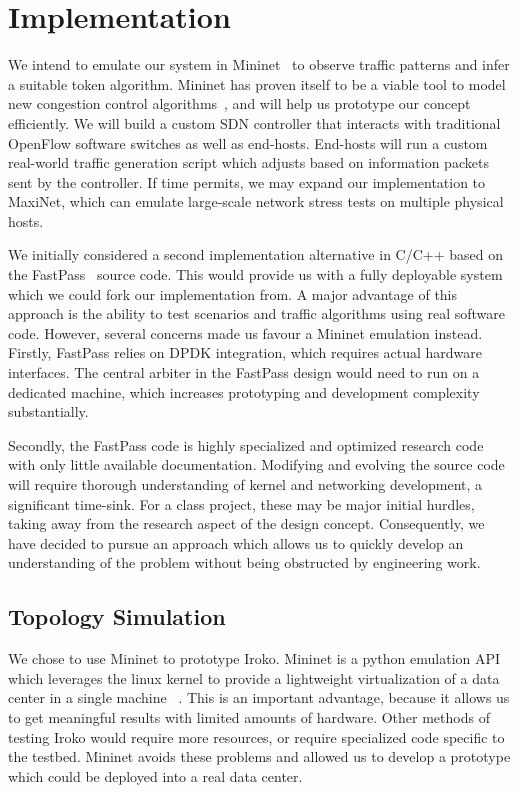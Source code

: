 

\section{Implementation}
\label{sec:implementation}
We intend to emulate our system in Mininet~\cite{mininet} to observe traffic 
patterns and infer a suitable token algorithm. Mininet has proven itself to be 
a viable tool to model new congestion control 
algorithms~\cite{mininet_learning}, and will help us prototype our concept 
efficiently. We will build a custom SDN controller that interacts with 
traditional OpenFlow software switches as well as end-hosts. End-hosts will run 
a custom real-world traffic generation script which adjusts based on 
information packets sent by the controller.
If time permits, we may expand our implementation to MaxiNet, which can emulate 
large-scale network stress tests on multiple physical hosts.

We initially considered a second implementation alternative in C/C++ based on 
the FastPass~\cite{fastpass} source code. This would provide us with a fully 
deployable system which we could fork our implementation from. A major 
advantage of this approach is the ability to test scenarios and traffic 
algorithms using real software code.
However, several concerns made us favour a Mininet emulation instead.
Firstly, FastPass relies on DPDK integration, which requires actual hardware 
interfaces. The central arbiter in the FastPass design would need to run on a 
dedicated machine, which increases prototyping and development complexity 
substantially.

Secondly, the FastPass code is highly specialized and optimized research code 
with only little available documentation. Modifying and evolving the source 
code will require thorough understanding of kernel and networking development, 
a significant time-sink. For a class project, these may be major initial 
hurdles, taking away from the research aspect of the design concept.
Consequently, we have decided to pursue an approach which allows us to quickly 
develop an understanding of the problem without being obstructed by engineering 
work.

\subsection{Topology Simulation}
We chose to use  Mininet to prototype Iroko. Mininet is a python emulation API which leverages the linux kernel to provide a lightweight virtualization of a data center in a single machine ~\cite{mininet}. This is an important advantage, because it allows us to get meaningful results with limited amounts of hardware. Other methods of testing Iroko would require more resources, or require specialized code specific to the testbed. Mininet avoids these problems and allowed us to develop a prototype which could be deployed into a real data center. 

